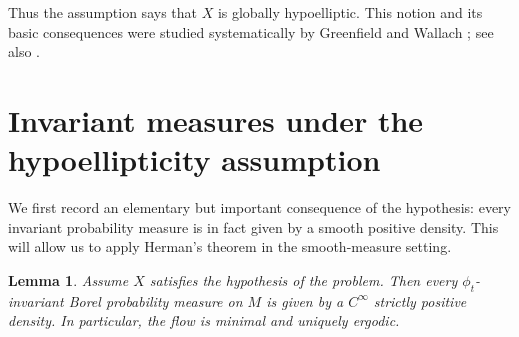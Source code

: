 \documentclass[11pt]{article}
\newtheorem{lemma}{Lemma}
\theoremstyle{definition}
\theoremstyle{remark}
\numberwithin{equation}{section}
\begin{document}
Thus the assumption says that \(X\) is globally hypoelliptic. This notion and its
basic consequences were studied systematically by Greenfield and Wallach
\cite{gw}; see also \cite{herman,kh}.

\section{Invariant measures under the hypoellipticity assumption}

We first record an elementary but important consequence of the hypothesis:
every invariant probability measure is in fact given by a smooth positive density.
This will allow us to apply Herman's theorem in the smooth-measure setting.

\begin{lemma}\label{lem:smooth-invariant-measures}
Assume \(X\) satisfies the hypothesis of the problem. Then every
\(\phi_t\)-invariant Borel probability measure on \(M\) is given by a
\(C^\infty\) strictly positive density. In particular, the flow is minimal and
uniquely ergodic.
\end{lemma}
\end{document}

